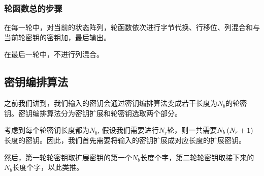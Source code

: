 \subsubsection{轮函数总的步骤}
在每一轮中，对当前的状态阵列，轮函数依次进行字节代换、行移位、列混合和与当前轮密钥的密钥加，最后输出。\par
在最后一轮中，不进行列混合。
\subsection{密钥编排算法}
之前我们讲到，我们输入的密钥会通过密钥编排算法变成若干长度为$N_b$的轮密钥。密钥编排算法分为密钥扩展和轮密钥选取两个部分。\par
考虑到每个轮密钥长度都为$N_b$, 假设我们需要进行$N_r$轮，则一共需要$N_b\left( {N_r+1}\right)$长度的密钥。因此，我们首先需要将输入的密钥扩展成对应长度的扩展密钥。\par
然后，第一轮轮密钥取扩展密钥的第一个$N_b$长度个字，第二轮轮密钥取接下来的$N_b$长度个字，以此类推。\par
